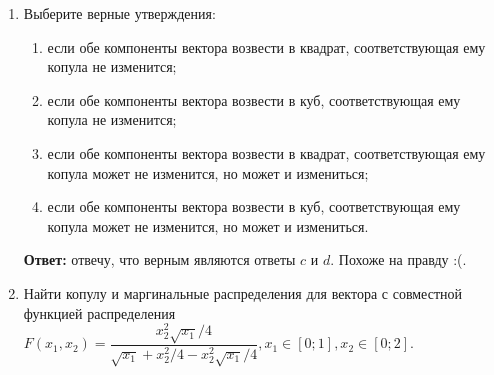 \documentclass[%
12pt, %
final, %
oneside, %
onecolumn, %
centertags]{article} %
\theoremstyle{plain}
\theoremstyle{definition}
\theoremstyle{remark}
\begin{document}
\begin{enumerate}
не стал подставлять одно в другое.

Чтобы найти математическое ожидание (а затем и диспесию по производящей функции моментов), возьмём производную по $t$ и подставим $0$ в нее. Все действия посчитаны в Wolfram.
$$E\xi_i = \psi_{\xi_i}(t)'_{t=0} = 5$$
$$E\xi_i^2 = \psi_{\xi_i}(t)''_{t=0} = 35$$
$$D\xi_i = E\xi_i^2 - (E\xi_i)^2 = 35 - 25 = 10$$ 
$$D(S_{coll}) = (E(\xi_i))^2 \cdot D(N) + D(\xi_i) \cdot E(N)$$

Здесь мы уже знаем все характеристики, связанные с убытком, поэтому нам необходимы характеристики случайной величины, отвечающей за убыток. Из производящей функции вероятностей найдем следующие величины:
$$P(N = 0) = \frac{\phi^{(0)}(0)}{0!} = 0$$
$$P(N = 1) = \frac{\phi^{(1)}(0)}{1!} = 0$$

Чтобы найти дисперсию и математическое ожидание $N$ получим производящую функцию моментов из производящей функции вероятности, подставим $e^t$ в производящую функцию моментов:
$$\psi_N(t) = \left(\dfrac{0.5 \cdot e^t}{1-0.5 \cdot e^t}\right)^5$$

Найдем математические ожидания и дисперсию и из него дисперсию коллективного риска:
$$E(N) = \psi_N(t)'_{t=0} = 10$$
$$E(N^2)  = \psi_N(t)''_{t=0} = 110$$
$$D(N) = 10$$
$$D(S_{coll}) = (E(\xi_i))^2 \cdot D(N) + D(\xi_i) \cdot E(N) = 25 \cdot 10 + 10 \cdot 10 = 350 \eqno \blacksquare$$



\item 
Выберите верные утверждения:
\begin{enumerate}
\setlength\itemsep{-0.15em}
    \item если обе компоненты вектора возвести в квадрат, соответствующая ему копула не изменится;
    \item если обе компоненты вектора возвести в куб, соответствующая ему копула не изменится;
    \item если обе компоненты вектора возвести в квадрат, соответствующая ему копула может не изменится, но может и измениться;
    \item если обе компоненты вектора возвести в куб, соответствующая ему копула может не изменится, но может и измениться.
\end{enumerate}

\textbf{Ответ:} отвечу, что верным являются ответы $c$ и $d$. Похоже на правду :(.

\item Найти копулу и маргинальные распределения для вектора с совместной функцией распределения $F(x_1,x_2)=\dfrac{x_2^2\sqrt{x_1}/4}{\sqrt{x_1}+x_2^2/4-x_2^2\sqrt{x_1}/4},x_1\in[0;1],x_2\in[0;2].$


\end{enumerate}
\end{document}
